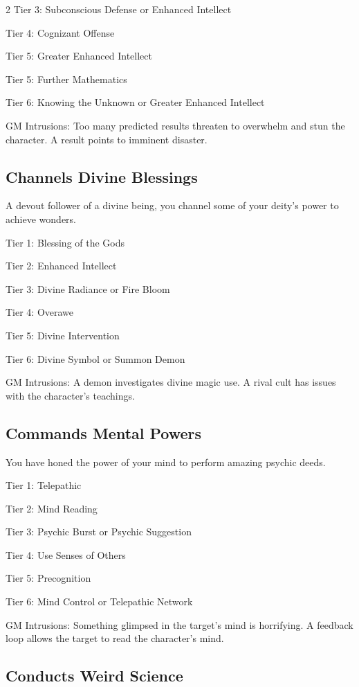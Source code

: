 \begin{multicols}{2}
Tier 3: Subconscious Defense or Enhanced Intellect

Tier 4: Cognizant Offense

Tier 5: Greater Enhanced Intellect

Tier 5: Further Mathematics

Tier 6: Knowing the Unknown or Greater Enhanced Intellect

GM Intrusions: Too many predicted results threaten to overwhelm and stun the character. A result points to imminent disaster.

\subsection{Channels Divine Blessings}

A devout follower of a divine being, you channel some of your deity’s power to achieve wonders.

Tier 1: Blessing of the Gods

Tier 2: Enhanced Intellect

Tier 3: Divine Radiance or Fire Bloom

Tier 4: Overawe

Tier 5: Divine Intervention

Tier 6: Divine Symbol or Summon Demon

GM Intrusions: A demon investigates divine magic use. A rival cult has issues with the character’s teachings.

\subsection{Commands Mental Powers}

You have honed the power of your mind to perform amazing psychic deeds.

Tier 1: Telepathic

Tier 2: Mind Reading

Tier 3: Psychic Burst or Psychic Suggestion

Tier 4: Use Senses of Others

Tier 5: Precognition

Tier 6: Mind Control or Telepathic Network 

GM Intrusions: Something glimpsed in the target’s mind is horrifying. A feedback loop allows the target to read the character’s mind.

\subsection{Conducts Weird Science}


\end{multicols}
